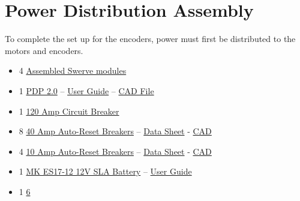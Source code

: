 \section{Power Distribution Assembly}
\resetassemblysteps

To complete the set up for the encoders, power must first be distributed
to the motors and encoders.

\begin{partsbox}
\begin{minipage}[t]{\linewidth}
\vspace{0pt}
\begin{itemize}
\item
  4 \protect\hyperlink{mk5i-swerve-module-assembly}{Assembled Swerve
  modules}
\item
  1 \href{https://store.ctr-electronics.com/products/pdp-2}{PDP 2.0} --
  \href{https://ctre.download/files/user-manual/PDP\%202.0\%20User's\%20Guide.pdf}{User
  Guide} --
  \href{https://github.com/CrossTheRoadElec/Device-CADs/raw/refs/heads/master/PDP2.0_CAD/PDP\%202.0\%20CAD.zip}{CAD
  File}
\item
  1
  \href{https://store.ctr-electronics.com/products/120-amp-breaker?pr_prod_strat=e5_desc\&pr_rec_id=6ce3ee740\&pr_rec_pid=8010746855597\&pr_ref_pid=8358474383533\&pr_seq=uniform}{120
  Amp Circuit Breaker}
\item
  8
  \href{https://store.ctr-electronics.com/products/auto-resetting-ato-breakers?pr_prod_strat=jac\&pr_rec_id=096140681\&pr_rec_pid=8358474383533\&pr_ref_pid=7922412847277\&pr_seq=uniform}{40
  Amp Auto-Reset Breakers} --
  \href{https://ctre.download/files/datasheet/CTRE\%20Breaker\%20Datasheet.pdf}{Data
  Sheet} - \href{https://ctre.download/cad/25-656640.step}{CAD}
\item
  4
  \href{https://store.ctr-electronics.com/products/auto-resetting-ato-breakers?variant=45044982644909}{10
  Amp Auto-Reset Breakers} --
  \href{https://ctre.download/files/datasheet/CTRE\%20Breaker\%20Datasheet.pdf}{Data
  Sheet} - \href{https://ctre.download/cad/25-656610.step}{CAD}
\item
  1
  \href{https://andymark.com/products/mk-es17-12-12v-sla-battery-set-of-2}{MK
  ES17-12 12V SLA Battery} --
  \href{https://s3.amazonaws.com/docusync-files/cacc1eb873bfa1d6bda7b8a738560a16992dd936cd4f6e119a512326d85e2759/am-0844\%20ES17-12\%20User\%20Guide.pdf}{User
  Guide}
\item
  1
  \href{https://andymark.com/products/6-gauge-12-inch-battery-cable?pr_prod_strat=jac\&pr_rec_id=099dfc460\&pr_rec_pid=8263871365292\&pr_ref_pid=8263859503276\&pr_seq=uniform}{6
}
\end{itemize}
\end{minipage}
\end{partsbox}
